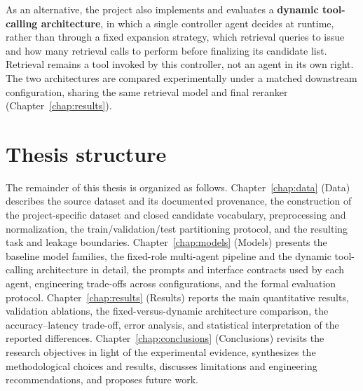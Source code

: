 As an alternative, the project also implements and evaluates a \textbf{dynamic tool-calling architecture}, in which a single controller agent decides at runtime, rather than through a fixed expansion strategy, which retrieval queries to issue and how many retrieval calls to perform before finalizing its candidate list. Retrieval remains a tool invoked by this controller, not an agent in its own right. The two architectures are compared experimentally under a matched downstream configuration, sharing the same retrieval model and final reranker (Chapter~\ref{chap:results}).

\section{Thesis structure}

The remainder of this thesis is organized as follows. Chapter~\ref{chap:data} (Data) describes the source dataset and its documented provenance, the construction of the project-specific dataset and closed candidate vocabulary, preprocessing and normalization, the train/validation/test partitioning protocol, and the resulting task and leakage boundaries. Chapter~\ref{chap:models} (Models) presents the baseline model families, the fixed-role multi-agent pipeline and the dynamic tool-calling architecture in detail, the prompts and interface contracts used by each agent, engineering trade-offs across configurations, and the formal evaluation protocol. Chapter~\ref{chap:results} (Results) reports the main quantitative results, validation ablations, the fixed-versus-dynamic architecture comparison, the accuracy--latency trade-off, error analysis, and statistical interpretation of the reported differences. Chapter~\ref{chap:conclusions} (Conclusions) revisits the research objectives in light of the experimental evidence, synthesizes the methodological choices and results, discusses limitations and engineering recommendations, and proposes future work.
